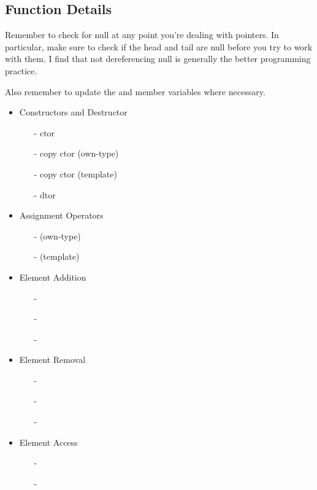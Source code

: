 \subsection{Function Details}


\indent Remember to check for null at any point you're dealing with pointers. In
particular, make sure to check if the head and tail are null before you try
to work with them. I find that not dereferencing null is generally the better
programming practice.

\indent Also remember to update the  and  member variables where
necessary.


\begin{itemize}
	\item Constructors and Destructor
	      \begin{itemize}
		      \item[-] ctor
		      \item[-] copy ctor (own-type)
		      \item[-] copy ctor (template)
		      \item[-] dtor
	      \end{itemize}
	\item Assignment Operators
	      \begin{itemize}
		      \item[-]  (own-type)
		      \item[-]  (template)
	      \end{itemize}
	\item Element Addition
	      \begin{itemize}
		      \item[-] 
		      \item[-] 
		      \item[-] 
	      \end{itemize}
	\item Element Removal
	      \begin{itemize}
		      \item[-] 
		      \item[-] 
		      \item[-] 
	      \end{itemize}
	\item Element Access
	      \begin{itemize}
		      \item[-] 
		      \item[-] 

\end{itemize}
\end{itemize}

